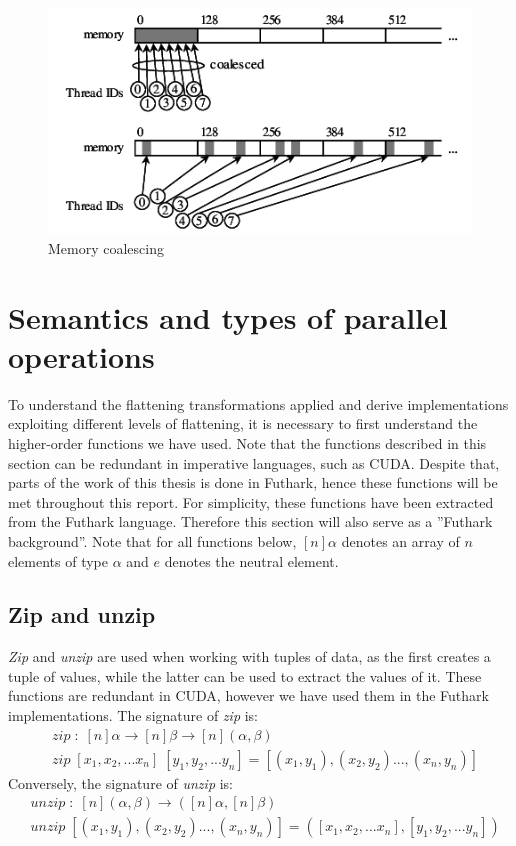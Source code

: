 \begin{figure}[H]
	\centering
	\includegraphics[width=.9\textwidth]{img/coalescing.png}
	\caption{Memory coalescing}
	\label{fig:background:memcoalescing}
\end{figure}

\newpage
\section{Semantics and types of parallel operations}
To understand the flattening transformations applied and derive implementations exploiting different levels of flattening, it is necessary to first understand the higher-order functions we have used. Note that the functions described in this section can be redundant in imperative languages, such as CUDA. Despite that, parts of the work of this thesis is done in Futhark, hence these functions will be met throughout this report. For simplicity, these functions have been extracted from the Futhark language. Therefore this section will also serve as a ''Futhark background''. Note that for all functions below, $[n]\alpha$ denotes an array of $n$ elements of type $\alpha$ and $e$ denotes the neutral element.

\subsection{Zip and unzip}
\textit{Zip} and \textit{unzip} are used when working with tuples of data, as the first creates a tuple of values, while the latter can be used to extract the values of it. These functions are redundant in CUDA, however we have used them in the Futhark implementations. The signature of \textit{zip} is:
\begin{align}
  \nonumber&\mathit{zip}\;:\;[n]\alpha\rightarrow[n]\beta\rightarrow[n](\alpha, \beta)\\
  \nonumber&\mathit{zip}\;[x_1, x_2, ... x_n]\;[y_1, y_2, ... y_n]=[(x_1, y_1),(x_2, y_2)...,(x_n, y_n)]
\end{align}
Conversely, the signature of \textit{unzip} is:
\begin{align}
  \nonumber&\mathit{unzip}\;:\;[n](\alpha, \beta)\rightarrow([n]\alpha,[n]\beta)\\
  \nonumber&\mathit{unzip}\;[(x_1, y_1),(x_2, y_2)...,(x_n, y_n)]=([x_1, x_2, ... x_n],[y_1, y_2, ... y_n])
\end{align}

